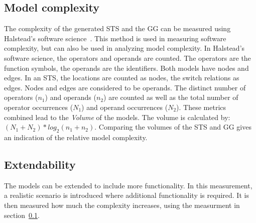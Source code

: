 \subsection{Model complexity}\label{sec:complexity_measurement}
The complexity of the generated STS and the GG can be measured using Halstead's software science~\cite{Halstead:software-science}. This method is used in measuring software complexity, but can also be used in analyzing model complexity. In Halstead's software science, the operators and operands are counted. The operators are the function symbols, the operands are the identifiers. Both models have nodes and edges. In an STS, the locations are counted as nodes, the switch relations as edges. Nodes and edges are considered to be operands. The distinct number of operators ($n_1$) and operands ($n_2$) are counted as well as the total number of operator occurrences ($N_1$) and operand occurrences ($N_2$). These metrics combined lead to the \textit{Volume} of the models. The volume is calculated by: $(N_1+N_2)*\mathit{log}_2(n_1+n_2)$. Comparing the volumes of the STS and GG gives an indication of the relative model complexity.

\subsection{Extendability}
The models can be extended to include more functionality. In this measurement, a realistic scenario is introduced where additional functionality is required. It is then measured how much the complexity increases, using the measurment in section~\ref{sec:complexity_measurement}.
